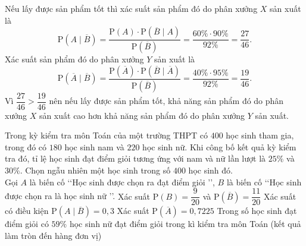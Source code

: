 \begin{ex}
{\begin{itemchoice}
			Nếu lấy được sản phẩm tốt thì xác suất sản  phẩm đó do phân xưởng $X$ sản xuất là $$\mathrm{P}\left(A\mid\overline B\right)=\dfrac{\mathrm{P}(A)\cdot \mathrm{P}\left(\overline B\mid A\right)}{\mathrm{P}\left(\overline B\right)}=\dfrac{60\% \cdot90\%}{92\%}=\dfrac{27}{46}.$$
			Xác suất sản phẩm đó do phân xưởng $Y$ sản xuất là $$\mathrm{P}\left(\overline A\mid\overline B\right)=\dfrac{\mathrm{P}\left(\overline  A\right)\cdot\mathrm{P}\left(\overline B\mid\overline A\right)}{\mathrm{P}\left(\overline B\right)}=\dfrac{40\% \cdot95\%}{92\%}=\dfrac{19}{46}.$$
			Vì $\dfrac{27}{46}>\dfrac{19}{46}$ nên nếu lấy được sản phẩm tốt, khả năng sản phẩm đó do phân xưởng $X$ sản xuất cao hơn  khả năng sản phẩm đó do phân xưởng $Y$ sản xuất.
		\end{itemchoice}
	} 
\end{ex}

\begin{ex}%
	Trong kỳ kiểm tra  môn Toán của một trường THPT có $400$ học sinh tham gia, trong đó có $180$ học sinh nam và $220$ học sinh nữ. Khi công bố kết quả kỳ kiểm tra đó, tỉ lệ học sinh đạt điểm giỏi tương ứng với nam và nữ lần lượt là $25\%$ và $30\%$. Chọn ngẫu nhiên một học sinh trong số $400$ học sinh đó.\\
	Gọi $A$ là  biến cố \lq\lq Học sinh được chọn ra đạt điểm giỏi \rq\rq, $B$ là biến cố \lq\lq Học sinh được chọn ra là học sinh nữ \rq\rq.
	 \choiceTF
		{\True Xác suất  $\mathrm{P}(B)=\dfrac{9}{20}$ và $\mathrm{P}(\overline{B})=\dfrac{11}{20}$}
		{Xác suất có  điều kiện $\mathrm{P}(A \mid \overline{B})=0{,}3$}
		{\True Xác  suất $\mathrm{P}(\overline{A})=0{,}7225$}
		{\True Trong số học  sinh đạt điểm giỏi có $59\%$ học sinh nữ đạt điểm giỏi trong kì kiểm tra môn Toán (kết quả làm tròn đến hàng đơn vị)}
\end{ex}

